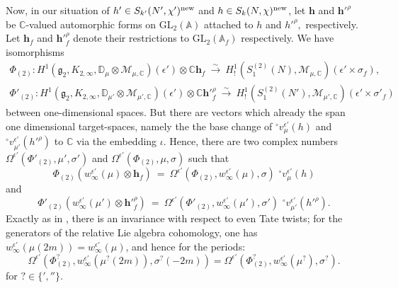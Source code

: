 \documentclass[11pt]{amsart}
\newcommand{\C}{\mathbb C}
\newcommand{\GL}{\mathrm{GL}}
\begin{document}
\smallskip
Now, in our situation of $h' \in S_{k'}(N',\chi')^{\textup{new}}$ and $h \in S_k(N,\chi)^{\textup{new}}$, 
let $\mathbf{h}$ and $\mathbf{h}'^\rho$ be $\C$-valued automorphic forms on $\GL_2(\mathbb{A})$ attached to $h$ and $h'^\rho,$ respectively. 
Let $\mathbf{h}_f$ and $\mathbf{h}'^\rho_f$ denote their restrictions to $\GL_2(\mathbb{A}_f)$ respectively.  We have isomorphisms 
\begin{gather*}
	\Phi_{(2)} :	
	H^{1}(\mathfrak{g}_2, K_{2, \infty}, \mathbb{D}_{\mu} \otimes \mathcal{M}_{\mu, \mathbb{C}})(\epsilon')
	\otimes \C\mathbf{h}_f \ \xrightarrow{\sim} \ 
	H^1_!(S^{(2)}_1(N), \mathcal{M}_{\mu,\mathbb{C}})(\epsilon'\times \sigma_f),\\
	\Phi'_{(2)} : H^{1}(\mathfrak{g}_2, K_{2, \infty}, \mathbb{D}_{\mu'}  \otimes \mathcal{M}_{\mu', \mathbb{C}})(\epsilon')
	\otimes \C\mathbf{h}'^\rho_f  \ \xrightarrow{\sim} \ 
	H^1_!(S^{(2)}_1(N'), \mathcal{M}_{\mu',\mathbb{C}})(\epsilon'\times \sigma'_f)
\end{gather*}
between one-dimensional spaces. But there are vectors which already the span one dimensional target-spaces, 
namely the the base change of ${^\circ}v^{\epsilon'}_{\mu}(h)$ and ${^\circ}v^{\epsilon'}_{\mu'}(h'^\rho)$ to $\mathbb{C}$ via the embedding $\iota$. 
Hence, there are two complex numbers
 $\Omega^{\epsilon'}(\Phi'_{(2)}, \mu', \sigma')$ and 
$\Omega^{\epsilon'}(\Phi_{(2)}, \mu, \sigma)$ such that
$$
\Phi_{(2)}(w_\infty^{\epsilon'}(\mu)\otimes \mathbf{h}_f) \ = \ 
\Omega^{\epsilon'}(\Phi_{(2)}, w_\infty^{\epsilon'}(\mu), \sigma) \,\,{^\circ}v_{\mu}^{\epsilon'}(h)
$$
and
$$
\Phi'_{(2)}(w_\infty^{\epsilon'}(\mu')\otimes \mathbf{h}'^\rho_f) \ = \  
\Omega^{\epsilon'}(\Phi'_{(2)}, w_\infty^{\epsilon'}(\mu'), \sigma') \,\,{^\circ}v_{\mu'}^{\epsilon'}(h'^\rho).
$$
Exactly as in \cite[Sect.\,5.2.4]{harder-raghuram}, there is an invariance with respect to even Tate twists; for the generators of the relative Lie algebra cohomology, 
one has $w_\infty^{\epsilon'}(\mu(2m)) = w_\infty^{\epsilon'}(\mu)$, and hence for the periods: 
\begin{equation} 
\Omega^{\epsilon'}(\Phi^?_{(2)}, w_\infty^{\epsilon'}(\mu^?(2m)), \sigma^?(-2m)) 
= \Omega^{\epsilon'}(\Phi^?_{(2)}, w_\infty^{\epsilon'}(\mu^?), \sigma^?). \label{eqn: period-under-tate-twist} 
\end{equation}
for $? \in \{ ', ''\}.$

\medskip
\end{document}
